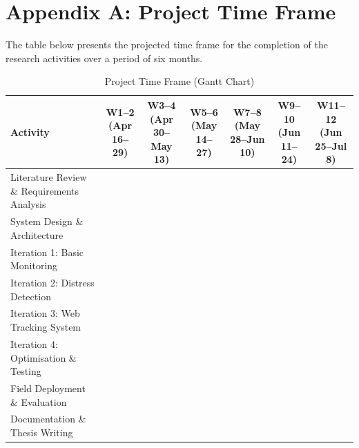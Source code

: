 \documentclass[12pt,a4paper]{report}
\begin{document}


\setcounter{table}{0}
\setcounter{figure}{0}
\renewcommand{\thetable}{A.\arabic{table}}
\renewcommand{\thefigure}{A.\arabic{figure}}
\chapter*{Appendix A: Project Time Frame}

The table below presents the projected time frame for the completion of the research activities over a period of six months.

\begin{table}[H]
\caption{Project Time Frame (Gantt Chart)}
\label{tab:gantt}
\centering
\small
\begin{tabularx}{\textwidth}{|X|c|c|c|c|c|c|}
\hline
\rowcolor{headerblue}
\textbf{Activity} & \shortstack{\textbf{\small W1--2}\\\scriptsize(Apr 16--29)} & \shortstack{\textbf{\small W3--4}\\\scriptsize(Apr 30--May 13)} & \shortstack{\textbf{\small W5--6}\\\scriptsize(May 14--27)} & \shortstack{\textbf{\small W7--8}\\\scriptsize(May 28--Jun 10)} & \shortstack{\textbf{\small W9--10}\\\scriptsize(Jun 11--24)} & \shortstack{\textbf{\small W11--12}\\\scriptsize(Jun 25--Jul 8)} \\
\hline
\footnotesize Literature Review \& Requirements Analysis & \cellcolor{ganttblue} & \cellcolor{ganttblue} & & & & \\
\hline
\footnotesize System Design \& Architecture & & \cellcolor{ganttblue} & \cellcolor{ganttblue} & & & \\
\hline
\footnotesize Iteration 1: Basic Monitoring & & & \cellcolor{ganttblue} & & & \\
\hline
\footnotesize Iteration 2: Distress Detection & & & & \cellcolor{ganttblue} & & \\
\hline
\footnotesize Iteration 3: Web Tracking System & & & & \cellcolor{ganttblue} & \cellcolor{ganttblue} & \\
\hline
\footnotesize Iteration 4: Optimisation \& Testing & & & & & \cellcolor{ganttblue} & \\
\hline
\footnotesize Field Deployment \& Evaluation & & & & & \cellcolor{ganttblue} & \cellcolor{ganttblue} \\
\hline
\footnotesize Documentation \& Thesis Writing & \cellcolor{ganttblue} & \cellcolor{ganttblue} & \cellcolor{ganttblue} & \cellcolor{ganttblue} & \cellcolor{ganttblue} & \cellcolor{ganttblue} \\
\hline
\end{tabularx}
\end{table}
\end{document}
